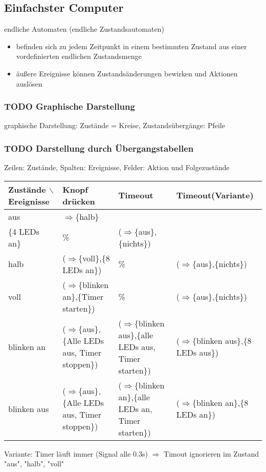 \documentclass[a4paper]{scrartcl}
\begin{document}
\subsection{Einfachster Computer}
\label{sec-5-3}
endliche Automaten (endliche Zustandsautomaten)
\begin{itemize}
\item befinden sich zu jedem Zeitpunkt in einem bestimmten Zustand aus einer vordefinierten endlichen Zustandsmenge
\item äußere Ereignisse können Zustandsänderungen bewirken und Aktionen auslösen
\end{itemize}
\subsubsection{{\bfseries\sffamily TODO} Graphische Darstellung}
\label{sec-5-3-1}
graphische Darstellung: Zustände = Kreise, Zustandsübergänge: Pfeile
\subsubsection{{\bfseries\sffamily TODO} Darstellung durch Übergangstabellen}
\label{sec-5-3-2}
Zeilen: Zustände, Spalten: Ereignisse, Felder: Aktion und Folgezustände
\begin{center}
\begin{tabular}{llll}
Zustände $\backslash$ Ereignisse & Knopf drücken & Timeout & Timeout(Variante)\\
\hline
aus & $\Rightarrow$\{halb\} \\ \{4 LEDs an\} & \% & ($\Rightarrow$\{aus\},\{nichts\})\\
halb & ($\Rightarrow$\{voll\},\{8 LEDs an\}) & \% & ($\Rightarrow$\{aus\},\{nichts\})\\
voll & ($\Rightarrow$\{blinken an\},\{Timer starten\}) & \% & ($\Rightarrow$\{aus\},\{nichts\})\\
blinken an & ($\Rightarrow$\{aus\},\{Alle LEDs aus, Timer stoppen\}) & ($\Rightarrow$\{blinken aus\},\{alle LEDs aus, Timer starten\}) & ($\Rightarrow$\{blinken aus\},\{8 LEDs aus\})\\
blinken aus & ($\Rightarrow$\{aus\},\{Alle LEDs aus, Timer stoppen\}) & ($\Rightarrow$\{blinken an\},\{alle LEDs an, Timer starten\}) & ($\Rightarrow$\{blinken an\},\{8 LEDs an\})\\
\end{tabular}
\end{center}

Variante: Timer läuft immer (Signal alle 0.3s) $\Rightarrow$ Timout ignorieren im Zustand "aus", "halb", "voll"
\end{document}

